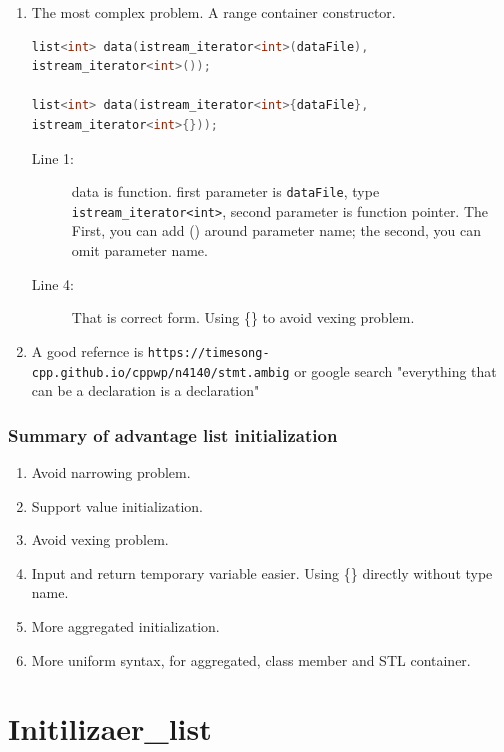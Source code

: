 \documentclass[a4paper,11pt,twoside]{book}
\begin{document}
\begin{enumerate}
	
	\item The most complex problem. A range container constructor. 
\begin{lstlisting}[frame=single, language=c++, mathescape=true]
list<int> data(istream_iterator<int>(dataFile), 
istream_iterator<int>()); 

list<int> data(istream_iterator<int>{dataFile}, 
istream_iterator<int>{})); 
\end{lstlisting}
\begin{description}
	\item[Line 1:] data is function. first parameter is \texttt{dataFile}, type \texttt{istream\_iterator<int>}, second parameter is function pointer. The First, you can add () around parameter name;  the second, you can omit parameter name.
	
	\item[Line 4:] That is correct form. Using \{\} to avoid vexing problem. 
\end{description}
		
	\item A good refernce is \verb|https://timesong-cpp.github.io/cppwp/n4140/stmt.ambig| or google search 
	"everything that can be a declaration is a declaration" 
	

\end{enumerate}

\subsubsection{Summary of advantage list initialization}
\begin{enumerate}
	\item Avoid narrowing problem.
	\item Support value initialization.
	\item Avoid vexing problem. 
	\item Input and return temporary variable easier. Using \{\} directly without type name. 
	\item More aggregated initialization.
	\item More uniform syntax, for aggregated, class member and STL container. 
\end{enumerate}


\section{Initilizaer\_list}
\end{document}
